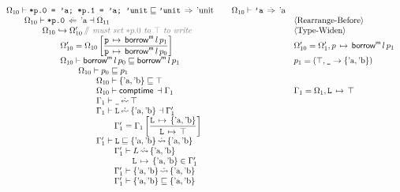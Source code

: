 \documentclass[12pt,twoside]{report}
\begin{document}
{\[\begin{array}{ll}
    \Omega_{10} \vdash \mono{*p.0 = 'a; *p.1 = 'a; 'unit} \subtype \mono{'unit} \movearrowabs \atom{unit}
    \otab \Omega_{10} \vdash \mono{'a} \movearrowabs \atom{a} \\
    \otab \Omega_{10} \vdash \mono{*p.0} \writearrowabs \atom{a} \dashv \Omega_{11} &
      \langle\text{Rearrange-Before}\rangle \\
    \otab \otab \Omega_{10} \rearrangearrow \Omega_{10}' \, \ocomment{must set $*p.0$ to $\top$ to write} &
      \langle\text{Type-Widen}\rangle \\
    \otab \otab\otab \Omega_{10}' = \Omega_{10}\left[\dfrac{\absmapm{p}{\borrowm{l}{p_1}}}{\absmapm{p}{\borrowm{l}{p_0}}}\right] &
      \Omega_{10}' = \Omega_1', \absmap{p}{\borrowm{l}{p_1}} \\
    \otab \otab\otab \Omega_{10} \vdash \borrowm{l}{p_0} \subtype \borrowm{l}{p_1}  &
      p_1 = (\top, \mono{\_} \rightarrow \{\atom{a}, \atom{b}\}) \\
    \otab \otab\otab\otab \Omega_{10} \vdash p_0 \subtype p_1 \\
    \otab \otab\otab\otab\otab \Omega_{10} \vdash \{\atom{a}, \atom{b}\} \subtype \top \\
    \otab \otab\otab\otab\otab \Omega_{10} \vdash \comptime{} \dashv \Gamma_1 &
      \Gamma_1 = \Omega_1,\absmapm{L}{\top} \\
    \otab \otab\otab\otab\otab \Gamma_1 \vdash \mono{\_} \erasedwritearrow \top \\
    \otab \otab\otab\otab\otab \Gamma_1 \vdash \mono{L} \erasedwritearrow \{\atom{a}, \atom{b}\} \dashv \Gamma_1' \\
    \otab \otab\otab\otab\otab\otab \Gamma_1' = \Gamma_1\left[\dfrac{\absmapm{L}{\{\atom{a}, \atom{b}\}}}{\absmapm{L}{\top}}\right] \\
    \otab \otab\otab\otab\otab \Gamma_1' \vdash \mono{L} \subtype \{\atom{a}, \atom{b}\} \erasedreadarrow \{\atom{a}, \atom{b}\} \\
    \otab \otab\otab\otab\otab\otab \Gamma_1' \vdash L \erasedreadarrow \{\atom{a}, \atom{b}\} \\
    \otab \otab\otab\otab\otab\otab\otab \absmapm{L}{\{\atom{a}, \atom{b}\}} \in \Gamma_1' \\
    \otab \otab\otab\otab\otab\otab \Gamma_1' \vdash \{\atom{a}, \atom{b}\} \erasedreadarrow \{\atom{a}, \atom{b}\} \\
    \otab \otab\otab\otab\otab\otab \Gamma_1' \vdash \{\atom{a}, \atom{b}\} \subtype \{\atom{a}, \atom{b}\} \\

\end{array}\]}
\end{document}
